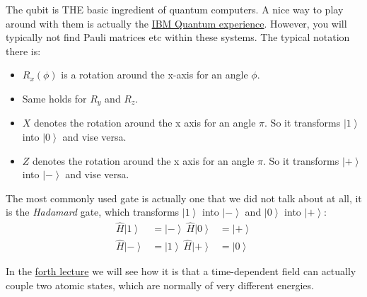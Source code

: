 \documentclass[10pt]{article}
\newcommand{\ket}[1]{\ensuremath{\left|#1\right\rangle}}
\begin{document}
The qubit is THE basic ingredient of quantum computers. A nice way to play around with them is actually the \href{https://quantum-computing.ibm.com/}{IBM Quantum experience}. However, you will typically not find Pauli matrices etc within these systems. The typical notation there is:
\begin{itemize}
\item $R_x(\phi)$ is a rotation around the x-axis for an angle $\phi$.
\item Same holds for $R_y$ and $R_z$.
\item $X$ denotes the rotation around the x axis for an angle $\pi$. So it transforms $\ket{1}$ into  $\ket{0}$ and vise versa.
\item $Z$ denotes the rotation around the x axis for an angle $\pi$. So it transforms $\ket{+}$ into  $\ket{-}$ and vise versa.
\end{itemize}
The most commonly used gate is actually one that we did not talk about at all, it is the \textit{Hadamard} gate, which transforms $\ket{1}$ into  $\ket{-}$ and $\ket{0}$ into  $\ket{+}$:
\begin{align}
\hat{H}\ket{1} &= \ket{-}  ~   \hat{H}\ket{0} &= \ket{+}\\
\hat{H}\ket{-} &= \ket{1}  ~   \hat{H}\ket{+} &= \ket{0}
\end{align}

In the \href{https://www.authorea.com/326506/emMDRkXxtm44IKqpCtDi6g}{forth lecture} we will see how it is that a time-dependent field can actually couple two atomic states, which are normally of very different energies.

\FloatBarrier


\end{document}
